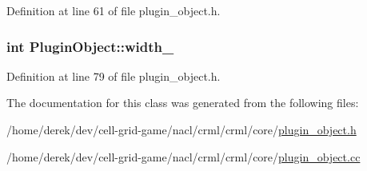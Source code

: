 Definition at line 61 of file plugin\_\-object.h.

\hypertarget{class_plugin_object_a2aa3a91e29c0c89a9c887aaba1f1b9d0}{
\subsubsection[{width\_\-}]{\setlength{\rightskip}{0pt plus 5cm}int {\bf PluginObject::width\_\-}}}
\label{class_plugin_object_a2aa3a91e29c0c89a9c887aaba1f1b9d0}


Definition at line 79 of file plugin\_\-object.h.



The documentation for this class was generated from the following files:\begin{DoxyCompactItemize}
\item 
/home/derek/dev/cell-\/grid-\/game/nacl/crml/crml/core/\hyperlink{plugin__object_8h}{plugin\_\-object.h}\item 
/home/derek/dev/cell-\/grid-\/game/nacl/crml/crml/core/\hyperlink{plugin__object_8cc}{plugin\_\-object.cc}\end{DoxyCompactItemize}
